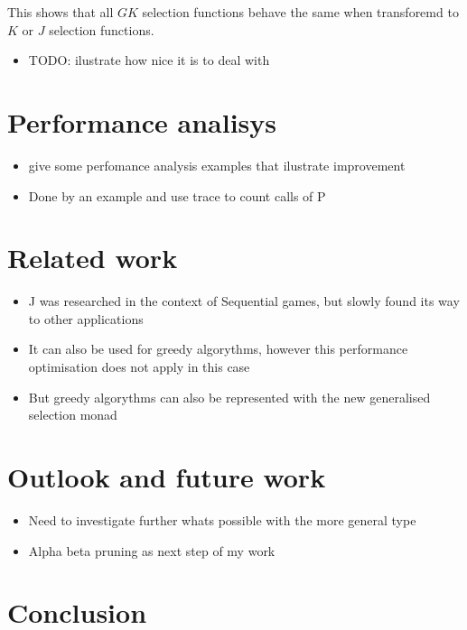 \documentclass[runningheads]{llncs}
\providecommand{\tightlist}{%
  \setlength{\itemsep}{0pt}\setlength{\parskip}{0pt}}
\begin{document}
This shows that all \(GK\) selection functions behave the same when
transforemd to \(K\) or \(J\) selection functions.

\begin{itemize}
\tightlist
\item
  TODO: ilustrate how nice it is to deal with
\end{itemize}

\section{Performance analisys}\label{performance-analisys}

\begin{itemize}
\tightlist
\item
  give some perfomance analysis examples that ilustrate improvement
\item
  Done by an example and use trace to count calls of P
\end{itemize}

\section{Related work}\label{related-work}

\begin{itemize}
\item
  J was researched in the context of Sequential games, but slowly found
  its way to other applications
\item
  It can also be used for greedy algorythms, however this performance
  optimisation does not apply in this case
\item
  But greedy algorythms can also be represented with the new generalised
  selection monad
\end{itemize}

\section{Outlook and future work}\label{outlook-and-future-work}

\begin{itemize}
\tightlist
\item
  Need to investigate further whats possible with the more general type
\item
  Alpha beta pruning as next step of my work
\end{itemize}

\section{Conclusion}\label{conclusion}
\end{document}

